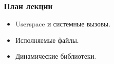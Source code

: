 \begin{frame}
\frametitle{План лекции}
\begin{itemize}
  \item Userspace и системные вызовы.
  \item Исполняемые файлы.
  \item Динамические библиотеки.
\end{itemize}
\end{frame}
